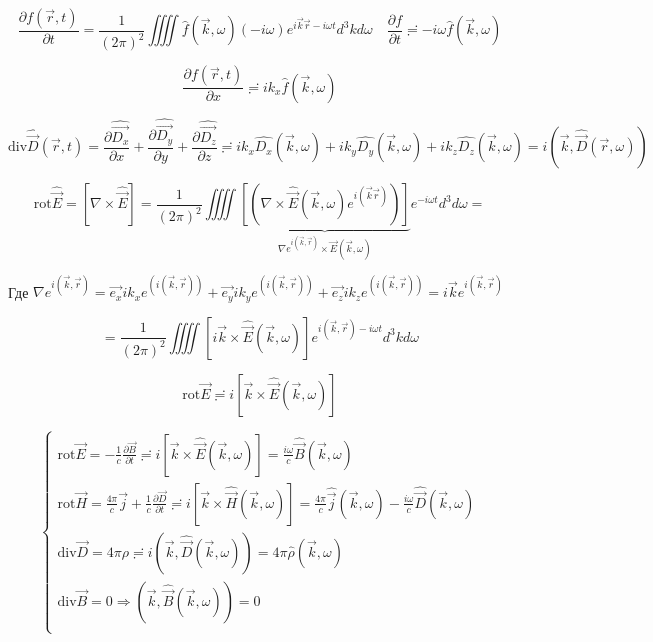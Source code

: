 \documentclass[12pt, a4paper]{report}
\begin{document}
\[ \frac{\partial f( \vec{r},t)}{\partial t} = \frac{1}{( 2 \pi ) ^2} \iiiint \hat{f}(\vec{k}, \omega) ( - i \omega) e^{i \vec{k}\vec{r} - i \omega t} d^3 k d \omega \quad \frac{\partial f}{\partial t}  \risingdotseq   - i \omega \hat{f}( \vec{k}, \omega)    \] 

\[ \frac{\partial f (\vec{r},t)}{\partial x} \risingdotseq i k_x \hat{f}( \vec{k}, \omega) \]

\[ \mathrm{div} \hat{\vec{D}}(\vec{r},t) = \frac{\partial \hat{\vec{D_x}}}{\partial x} + \frac{\partial \hat{\vec{D_y}}}{\partial y} + \frac{\partial \hat{\vec{D_z}}}{\partial z} \risingdotseq i k_x \hat{D_x}(\vec{k}, \omega) + i k_y \hat{D_y}(\vec{k}, \omega) + i k_z \hat{D_z}(\vec{k}, \omega)  = i (\vec{k},\hat{\vec{D}}(\vec{r}, \omega) ) \] 

\[ \mathrm{rot}\hat{\vec{E}}  = [\nabla \times  \hat{\vec{E}} ] = \frac{1}{( 2 \pi ) ^2 } \iiiint \underbrace{\left[ (\nabla \times  \hat{\vec{E}} (\vec{k}, \omega)e^{i (\vec{k}\vec{r}) }   ) \right]}_{\nabla e^{i (\vec{k }, \vec{r })}   \times \vec{E } (\vec{k },\omega) }   e^{- i \omega t } d ^3 d \omega  =      \] 

\begin{center}
    Где \(\nabla e^{i (\vec{k }, \vec{r })} = \vec{e_x }i k_xe^{(i (\vec{k }, \vec{r }))}+ \vec{e_y } i k_y e^{(i (\vec{k }, \vec{r }))} + \vec{e_z } i k_z e^{(i (\vec{k }, \vec{r }))}= i\vec{k } e ^{ i ( \vec{k } , \vec{r})} \)    
\end{center}


\[= \frac{1}{( 2 \pi) ^2 } \iiiint \left[ i \vec{k} \times  \hat{\vec{E }}( \vec{k }, \omega)  \right] e^{i(\vec{k}, \vec{r})- i \omega t} d ^3 k d \omega \] 

\[ \mathrm{rot} \vec{ E }  \risingdotseq i \left[ \vec{k} \times \hat{\vec{E}}(\vec{k}, \omega) \right]   \] 
 
\[ 
\begin{cases}
        \displaystyle \mathrm{rot} \vec{ E } = - \frac{1}{c} \frac{ \partial \vec{B}}{ \partial t} \risingdotseq i \left[ \vec{k } \times \hat{\vec{E}} ( \vec{k }, \omega)  \right] = \frac{i \omega}{c} \hat{\vec{B } } ( \vec{k }, \omega)     \\
        \displaystyle \mathrm{rot} \vec{H} = \frac{ 4 \pi }{ c} \vec{j } + \frac{1}{ c  }  \frac{ \partial \vec{ D } }{ \partial t } \risingdotseq  i \left[ \vec{k } \times \hat{\vec{H}} ( \vec{k }, \omega) \right] = \frac{  4 \pi }{ c } \hat{\vec{j}} ( \vec{k }, \omega)  - \frac{ i \omega }{c } \hat{ \vec{D} } ( \vec{k }, \omega)        \\
        \displaystyle \mathrm{div} \vec{D } = 4 \pi \rho \risingdotseq i ( \vec{k }, \hat{\vec{D}} ( \vec{k }, \omega) ) = 4 \pi \hat{\rho}  ( \vec{k }, \omega)   \\
        \displaystyle \mathrm{div} \vec{B} = 0 \Rightarrow (\vec{k },\hat{\vec{B}} ( \vec{k }, \omega)) = 0    \\
\end{cases}
\] 
\end{document}
